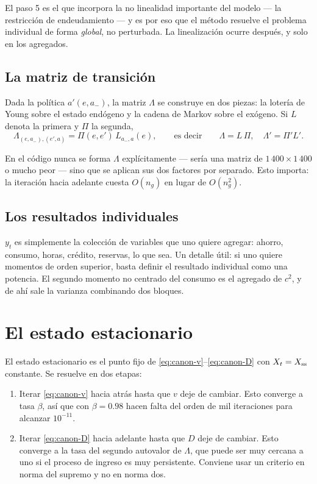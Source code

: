 El paso 5 es el que incorpora la no linealidad importante del modelo --- la
restricción de endeudamiento --- y es por eso que el método resuelve el problema
individual de forma \emph{global}, no perturbada. La linealización ocurre
después, y solo en los agregados.

\subsection{La matriz de transición}

Dada la política $a'(e,a_-)$, la matriz $\Lambda$ se construye en dos piezas:
la lotería de Young sobre el estado endógeno y la cadena de Markov sobre el
exógeno. Si $L$ denota la primera y $\Pi$ la segunda,
\begin{equation}
\Lambda_{(e,a_-),(e',a)} = \Pi(e,e')\, L_{a_-,a}(e),
\qquad\text{es decir}\qquad
\Lambda = L\,\Pi, \quad \Lambda' = \Pi' L'.
\end{equation}

En el código nunca se forma $\Lambda$ explícitamente --- sería una matriz de
$1\,400\times 1\,400$ o mucho peor --- sino que se aplican sus dos factores por
separado. Esto importa: la iteración hacia adelante cuesta $O(n_g)$ en lugar de
$O(n_g^2)$.

\subsection{Los resultados individuales}

$y_t$ es simplemente la colección de variables que uno quiere agregar: ahorro,
consumo, horas, crédito, reservas, lo que sea. Un detalle útil: si uno quiere
momentos de orden superior, basta definir el resultado individual como una
potencia. El segundo momento no centrado del consumo es el agregado de $c^2$, y
de ahí sale la varianza combinando dos bloques.

\section{El estado estacionario}

El estado estacionario es el punto fijo de \eqref{eq:canon-v}--\eqref{eq:canon-D}
con $X_t = X_{\mathrm{ss}}$ constante. Se resuelve en dos etapas:

\begin{enumerate}[leftmargin=1.4em]
\item Iterar \eqref{eq:canon-v} hacia atrás hasta que $v$ deje de cambiar. Esto
converge a tasa $\beta$, así que con $\beta=0.98$ hacen falta del orden de mil
iteraciones para alcanzar $10^{-11}$.
\item Iterar \eqref{eq:canon-D} hacia adelante hasta que $D$ deje de cambiar.
Esto converge a la tasa del segundo autovalor de $\Lambda$, que puede ser muy
cercana a uno si el proceso de ingreso es muy persistente. Conviene usar un
criterio en norma del supremo y no en norma dos.
\end{enumerate}

